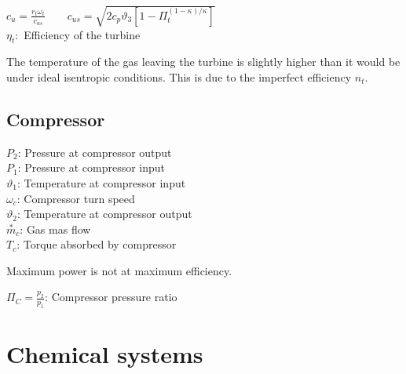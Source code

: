 \documentclass[10pt,a4paper]{scrartcl}
\begin{document}
\begin{multicols*}{3}

$c_u=\frac{r_t\omega_t}{c_{us}}\qquad c_{us}=\sqrt{2c_p\vartheta_3[1-\Pi_t^{(1-\kappa)/\kappa}]}$ \\
$\eta_t:$ Efficiency of the turbine


The temperature of the gas leaving the turbine is slightly higher than it would be under ideal isentropic conditions. This is due to the imperfect efficiency $n_t$.


\subsection{Compressor}\label{Compressor}


$P_2$: Pressure at compressor output \\
$P_1$: Pressure at compressor input \\
$\vartheta_1$: Temperature at compressor input \\
$\omega_c$: Compressor turn speed \\
$\vartheta_2$: Temperature at compressor output \\
$\overset{\ast}{m}_c$: Gas mas flow \\
$T_c$: Torque absorbed by compressor \\


Maximum power is not at maximum efficiency.



$\Pi_C=\frac{p_2}{p_1}$: Compressor pressure ratio

\vfill
\null
\columnbreak

\section{Chemical systems}



\end{multicols*}
\end{document}
